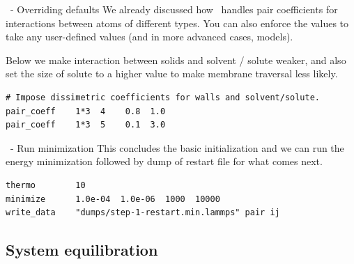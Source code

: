 \begin{frame}[fragile]{\secname}{\subsecname\ - Overriding defaults}
We already discussed how \LAMMPS\ handles pair coefficients for interactions between atoms of different types. You can also enforce the values to take any user-defined values (and in more advanced cases, models).

\vspace{0.5cm}

Below we make interaction between solids and solvent  / solute  weaker, and also set the size of solute  to a higher value to make membrane traversal less likely.

\vspace{0.5cm}

\begin{lstlisting}[language=LAMMPS,basicstyle=\small]
# Impose dissimetric coefficients for walls and solvent/solute.
pair_coeff    1*3  4    0.8  1.0
pair_coeff    1*3  5    0.1  3.0
\end{lstlisting}
\end{frame}

\begin{frame}[fragile]{\secname}{\subsecname\ - Run minimization}
This concludes the basic initialization and we can run the energy minimization followed by dump of restart file for what comes next.

\vspace{0.5cm}

\begin{lstlisting}[language=LAMMPS,basicstyle=\small]
thermo        10
minimize      1.0e-04  1.0e-06  1000  10000
write_data    "dumps/step-1-restart.min.lammps" pair ij
\end{lstlisting}
\end{frame}

\subsection{System equilibration}

